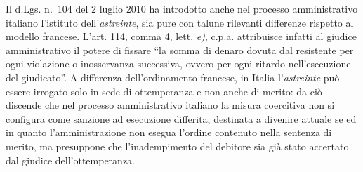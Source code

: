 \documentclass[12pt,it,a4paper,]{report}
\begin{document}
Il d.Lgs. n.~104 del 2 luglio 2010 ha introdotto anche nel processo
amministrativo italiano l'istituto dell'\emph{astreinte}, sia pure con
talune rilevanti differenze rispetto al modello francese. L'art. 114,
comma 4, lett. \emph{e)}, c.p.a. attribuisce infatti al giudice
amministrativo il potere di fissare ``la somma di denaro dovuta dal
resistente per ogni violazione o inosservanza successiva, ovvero per
ogni ritardo nell'esecuzione del giudicato''. A differenza
dell'ordinamento francese, in Italia l'\emph{astreinte} può essere
irrogato solo in sede di ottemperanza e non anche di merito: da ciò
discende che nel processo amministrativo italiano la misura coercitiva
non si configura come sanzione ad esecuzione differita, destinata a
divenire attuale se ed in quanto l'amministrazione non esegua l'ordine
contenuto nella sentenza di merito, ma presuppone che l'inadempimento
del debitore sia già stato accertato dal giudice dell'ottemperanza.
\end{document}
